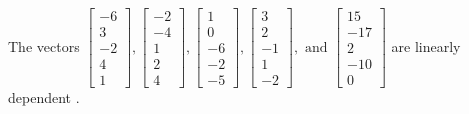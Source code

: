 \begin{exercise}
\begin{exerciseStatement}
  \end{exerciseStatement}
  \begin{exerciseAnswer}
   The vectors \(\left[\begin{array}{r}
-6 \\
3 \\
-2 \\
4 \\
1
\end{array}\right] , \left[\begin{array}{r}
-2 \\
-4 \\
1 \\
2 \\
4
\end{array}\right] , \left[\begin{array}{r}
1 \\
0 \\
-6 \\
-2 \\
-5
\end{array}\right] , \left[\begin{array}{r}
3 \\
2 \\
-1 \\
1 \\
-2
\end{array}\right] , \text{ and } \left[\begin{array}{r}
15 \\
-17 \\
2 \\
-10 \\
0
\end{array}\right]\) are 
  	 linearly dependent  .
  


  \end{exerciseAnswer}
\end{exercise}
